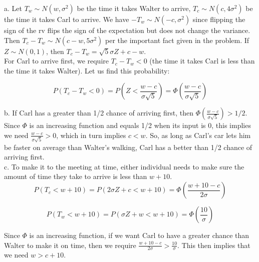 a. Let \(T_{w} \sim N(w, \sigma^{2})\) be the time it takes Walter to arrive, \(T_{c} \sim N(c, 4\sigma^{2})\) be the time it takes Carl to arrive. We have \(-T_{w} \sim N(-c, \sigma^{2})\) since flipping the sign of the rv flips the sign of the expectation but does not change the variance. Then \(T_{c}-T_{w} \sim N(c-w, 5\sigma^{2})\) per the important fact given in the problem. If \(Z \sim N(0,1)\), then \(T_{c}-T_{w} = \sqrt{5}\sigma Z +c -w\).\\

For Carl to arrive first, we require \(T_{c}-T_{w} < 0\) (the time it takes Carl is less than the time it takes Walter). Let us find this probability:

\[P(T_{c}-T_{w} < 0) = P(Z < \frac{w-c}{\sigma \sqrt{5}}) = \Phi(\frac{w-c}{\sigma \sqrt{5}})\]

b. If Carl has a greater than 1/2 chance of arriving first, then \(\Phi(\frac{w-c}{\sigma \sqrt{5}}) > 1/2\). Since \(\Phi\) is an increasing function and equals 1/2 when its input is 0, this implies we need \(\frac{w-c}{\sigma \sqrt{5}} > 0\), which in turn implies \(c < w\). So, as long as Carl's car lets him be faster on average than Walter's walking, Carl has a better than 1/2 chance of arriving first. \\

c. To make it to the meeting at time, either individual needs to make sure the amount of time they take to arrive is less than \(w+10\).\\

\[P(T_{c} < w+10) = P(2\sigma Z +c < w+10) = \Phi(\frac{w+10-c}{2\sigma})\]

\[P(T_{w} < w+10) = P(\sigma Z + w < w+10) = \Phi(\frac{10}{\sigma})\]

Since \(\Phi\) is an increasing function, if we want Carl to have a greater chance than Walter to make it on time, then we require \(\frac{w+10-c}{2 \sigma} > \frac{10}{\sigma}\). This then implies that we need \(w > c+10\). 
